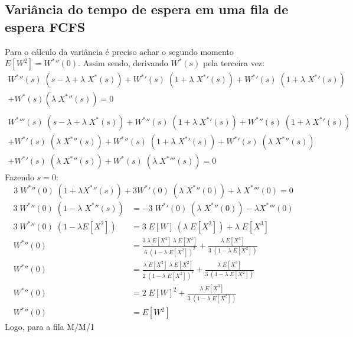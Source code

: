 \documentclass[a4paper]{article}
\newcommand{\E}[1]{E\!\left[#1\right]}
\begin{document}
\subsection{Variância do tempo de espera em uma fila de espera FCFS}
Para o cálculo da variância
é preciso achar o segundo momento \(\E{W^2} = {W^*}''(0)\).
Assim sendo, derivando \(W^*(s)\) pela terceira vez:
\begin{align*}
    {W^*}''(s) \; (s - \lambda + \lambda \; X^*(s))
        + {W^*}'(s) \; (1 + \lambda \; {X^*}'(s))
        + {W^*}'(s) \; (1 + \lambda \; {X^*}'(s)) \\
        + W^*(s)(\lambda \; {X^*}''(s)) = 0 \\
\end{align*} \begin{align*}
    {W^*}'''(s) \; (s - \lambda + \lambda \; X^*(s))
        + {W^*}''(s) \; (1 + \lambda \; {X^*}'(s))
        + {W^*}''(s) \; (1 + \lambda \; {X^*}'(s)) \\
        + {W^*}'(s) \; (\lambda \; {X^*}''(s))
        + {W^*}''(s) \; (1 + \lambda \; {X^*}'(s))
        + {W^*}'(s) \; (\lambda \; {X^*}''(s)) \\
        + {W^*}'(s) \; (\lambda \; {X^*}''(s))
        + W^*(s) \; (\lambda \; {X^*}'''(s)) = 0
\end{align*}
Fazendo \(s = 0\):
\[
    3 \; {W^*}''(0) \; (1 + \lambda {X^*}''(s))
        + 3 {W^*}'(0) \; (\lambda \; {X^*}''(0))
        + \lambda \; {X^*}'''(0) = 0
\]
\begin{align*}
    3 \; {W^*}''(0) \; (1 - \lambda \; {X^*}''(s))
        &= -3 \; {W^*}'(0) \; (\lambda \; {X^*}''(0))
        - \lambda {X^*}'''(0) \\
    3 \; {W^*}''(0) \; (1 - \lambda \E{X^2})
        &= 3 \; \E{W} \; (\lambda \; \E{X^2})
        + \lambda \; \E{X^3} \\
    {W^*}''(0) &= \frac{3 \; \lambda \; \E{X^2}
        \; \lambda \; \E{X^2}}{6 \; (1 - \lambda \; \E{X^2})^2}
        + \frac{\lambda \; \E{X^3}}{3
        \; (1 - \lambda \; \E{X^2})} \\
    {W^*}''(0) &= \frac{\lambda \; \E{X^2} \; \lambda
        \; \E{X^2}}{2 \; (1 - \lambda \; \E{X^2})^2}
        + \frac{\lambda \; \E{X^3}}{3
        \; (1 - \lambda \; \E{X^2})} \\
    {W^*}''(0) &= 2 \; \E{W}^2
        + \frac{\lambda \; \E{X^3}}{3
        \; (1 - \lambda \; \E{X^2})} \\
    {W^*}''(0) &= E[W^2]
\end{align*}
Logo, para a fila M/M/1
\end{document}
